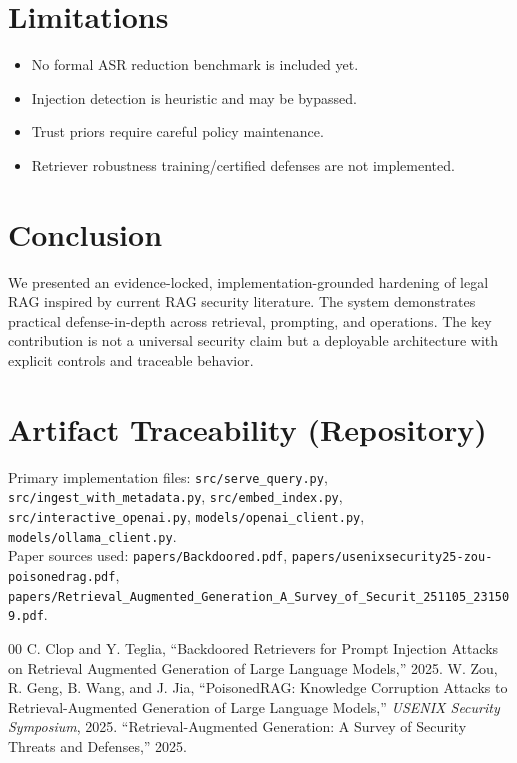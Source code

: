 \documentclass[conference]{IEEEtran}
\begin{document}
\section{Limitations}
\begin{itemize}
    \item No formal ASR reduction benchmark is included yet.
    \item Injection detection is heuristic and may be bypassed.
    \item Trust priors require careful policy maintenance.
    \item Retriever robustness training/certified defenses are not implemented.
\end{itemize}

\section{Conclusion}
We presented an evidence-locked, implementation-grounded hardening of legal RAG inspired by current RAG security literature. The system demonstrates practical defense-in-depth across retrieval, prompting, and operations. The key contribution is not a universal security claim but a deployable architecture with explicit controls and traceable behavior.

\section*{Artifact Traceability (Repository)}
Primary implementation files: \texttt{src/serve\_query.py}, \texttt{src/ingest\_with\_metadata.py}, \texttt{src/embed\_index.py}, \texttt{src/interactive\_openai.py}, \texttt{models/openai\_client.py}, \texttt{models/ollama\_client.py}.\\
Paper sources used: \texttt{papers/Backdoored.pdf}, \texttt{papers/usenixsecurity25-zou-poisonedrag.pdf}, \texttt{papers/Retrieval\_Augmented\_Generation\_A\_Survey\_of\_Securit\_251105\_231509.pdf}.

\begin{thebibliography}{00}
 C. Clop and Y. Teglia, ``Backdoored Retrievers for Prompt Injection Attacks on Retrieval Augmented Generation of Large Language Models,'' 2025.
 W. Zou, R. Geng, B. Wang, and J. Jia, ``PoisonedRAG: Knowledge Corruption Attacks to Retrieval-Augmented Generation of Large Language Models,'' \emph{USENIX Security Symposium}, 2025.
 ``Retrieval-Augmented Generation: A Survey of Security Threats and Defenses,'' 2025.
\end{thebibliography}
\end{document}

